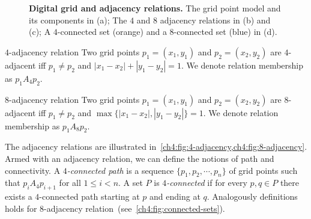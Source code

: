 \begin{figure}
\begin{minipage}{0.4\textwidth}
\end{minipage}

\caption{\textbf{Digital grid and adjacency relations.} The grid point model and its components in (a); The $4$ and $8$ adjacency relations in (b) and (c); A $4$-connected set (orange) and a $8$-connected set (blue) in (d).}
\label{ch4:fig:digital-grid}
\end{figure}

\begin{definition}{$4$-adjacency relation}
Two grid points $p_1=(x_1,y_1)$ and $p_2=(x_2,y_2)$ are $4$-adjacent iff $p_1 \neq p_2$ and $|x_1-x_2| + |y_1-y_2| = 1$. We denote relation membership as $p_1A_4p_2$.
\end{definition}

\begin{definition}{$8$-adjacency relation}
Two grid points $p_1=(x_1,y_1)$ and $p_2=(x_2,y_2)$ are $8$-adjacent iff $p_1 \neq p_2$ and $\max \{ |x_1-x_2|, |y_1-y_2| \} = 1$. We denote relation membership as $p_1A_8p_2$.
\end{definition}

The adjacency relations are illustrated in~\cref{ch4:fig:4-adjacency,ch4:fig:8-adjacency}. Armed with an adjacency relation, we can define the notions of path and connectivity. A \emph{$4$-connected path} is a sequence $\{p_1,p_2,\cdots, p_n\}$ of grid points such that $p_iA_4p_{i+1}$ for all $1 \leq i < n$. A set $P$ is \emph{$4$-connected} if for every $p,q \in P$ there exists a $4$-connected path starting at $p$ and ending at $q$. Analogously definitions holds for $8$-adjacency relation~(see~\cref{ch4:fig:connected-sets}).


